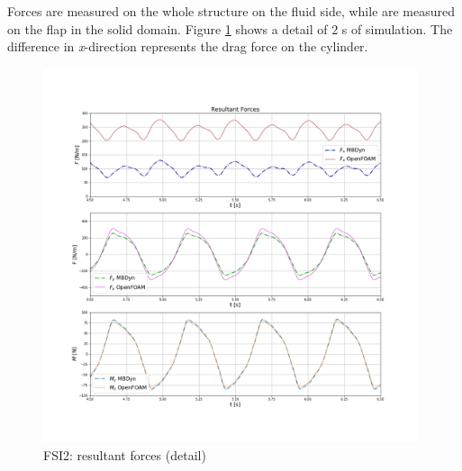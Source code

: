 Forces are measured on the whole structure on the fluid side, while are measured on the flap in the solid domain. Figure \ref{fig:FSI2_force} shows a detail of $2$ \si{s} of simulation. The difference in \textit{x}-direction represents the drag force on the cylinder.
\begin{figure}[htbp!]
	\centering
	\includegraphics[width=0.98\textwidth, trim=20 100 20 100, clip]{images/FSI2/forces_fsi2.png}
	\caption{FSI2: resultant forces (detail)}
	\label{fig:FSI2_force}
\end{figure}


